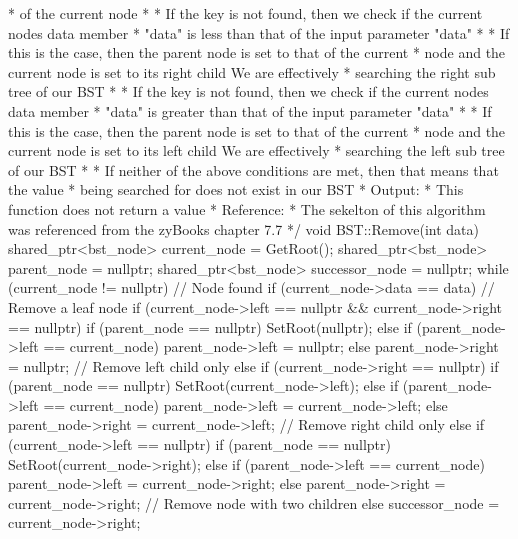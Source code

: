 \begin{highlight}
\begin{code}
*           of the current node
*     * If the key is not found, then we check if the current nodes data member 
*       "data" is less than that of the input parameter "data"
*       * If this is the case, then the parent node is set to that of the current 
*         node and the current node is set to its right child We are effectively 
*         searching the right sub tree of our BST
*     * If the key is not found, then we check if the current nodes data member 
*       "data" is greater than that of the input parameter "data"
*       * If this is the case, then the parent node is set to that of the current 
*         node and the current node is set to its left child We are effectively 
*         searching the left sub tree of our BST
*     * If neither of the above conditions are met, then that means that the value 
*       being searched for does not exist in our BST
*   Output:
*     This function does not return a value
*   Reference:
*     The sekelton of this algorithm was referenced from the zyBooks chapter 7.7 
*/
void BST::Remove(int data) {
shared_ptr<bst_node> current_node = GetRoot();
shared_ptr<bst_node> parent_node = nullptr;
shared_ptr<bst_node> successor_node = nullptr;
while (current_node != nullptr) {
    // Node found
    if (current_node->data == data) {
        // Remove a leaf node
        if (current_node->left == nullptr && current_node->right == nullptr) {
            if (parent_node == nullptr) {
                SetRoot(nullptr);
            }
            else if (parent_node->left == current_node) {
                parent_node->left = nullptr;
            }
            else {
                parent_node->right = nullptr;
            }
        }
        // Remove left child only
        else if (current_node->right == nullptr) {
            if (parent_node == nullptr) {
                SetRoot(current_node->left);
            }
            else if (parent_node->left == current_node) {
                parent_node->left = current_node->left;
            }
            else {
                parent_node->right = current_node->left;
            }
        }
        // Remove right child only
        else if (current_node->left == nullptr) {
            if (parent_node == nullptr) {
                SetRoot(current_node->right);
            }
            else if (parent_node->left == current_node) {
                parent_node->left = current_node->right;
            }
            else {
                parent_node->right = current_node->right;
            }
        }
        // Remove node with two children
        else {
            successor_node = current_node->right;
}}}}
\end{code}
\end{highlight}
